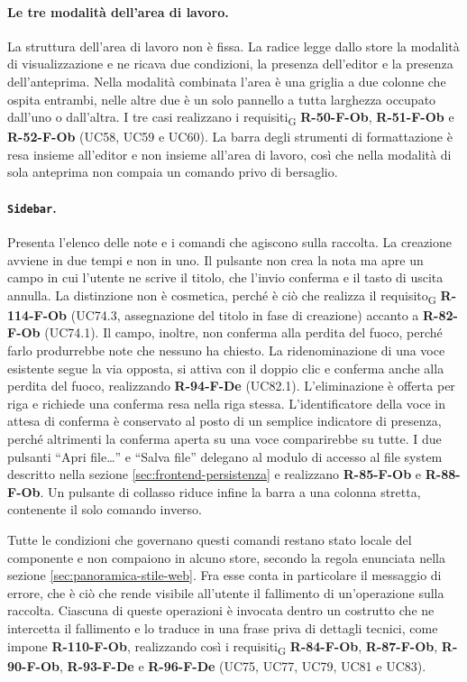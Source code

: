 \documentclass[a4paper, 10pt]{article}
\begin{document}
\paragraph{Le tre modalità dell'area di lavoro.}
La struttura dell'area di lavoro non è fissa. La radice legge dallo store la modalità di visualizzazione e ne ricava due condizioni, la presenza dell'editor e la presenza dell'anteprima. Nella modalità combinata l'area è una griglia a due colonne che ospita entrambi, nelle altre due è un solo pannello a tutta larghezza occupato dall'uno o dall'altra. I tre casi realizzano i requisiti\textsubscript{G} \textbf{R-50-F-Ob}, \textbf{R-51-F-Ob} e \textbf{R-52-F-Ob} (UC58, UC59 e UC60). La barra degli strumenti di formattazione è resa insieme all'editor e non insieme all'area di lavoro, così che nella modalità di sola anteprima non compaia un comando privo di bersaglio.

\paragraph{\texttt{Sidebar}.}
Presenta l'elenco delle note e i comandi che agiscono sulla raccolta. La creazione avviene in due tempi e non in uno. Il pulsante non crea la nota ma apre un campo in cui l'utente ne scrive il titolo, che l'invio conferma e il tasto di uscita annulla. La distinzione non è cosmetica, perché è ciò che realizza il requisito\textsubscript{G} \textbf{R-114-F-Ob} (UC74.3, assegnazione del titolo in fase di creazione) accanto a \textbf{R-82-F-Ob} (UC74.1). Il campo, inoltre, non conferma alla perdita del fuoco, perché farlo produrrebbe note che nessuno ha chiesto. La ridenominazione di una voce esistente segue la via opposta, si attiva con il doppio clic e conferma anche alla perdita del fuoco, realizzando \textbf{R-94-F-De} (UC82.1). L'eliminazione è offerta per riga e richiede una conferma resa nella riga stessa. L'identificatore della voce in attesa di conferma è conservato al posto di un semplice indicatore di presenza, perché altrimenti la conferma aperta su una voce comparirebbe su tutte. I due pulsanti ``Apri file\ldots'' e ``Salva file'' delegano al modulo di accesso al file system descritto nella sezione \ref{sec:frontend-persistenza} e realizzano \textbf{R-85-F-Ob} e \textbf{R-88-F-Ob}. Un pulsante di collasso riduce infine la barra a una colonna stretta, contenente il solo comando inverso.

Tutte le condizioni che governano questi comandi restano stato locale del componente e non compaiono in alcuno store, secondo la regola enunciata nella sezione \ref{sec:panoramica-stile-web}. Fra esse conta in particolare il messaggio di errore, che è ciò che rende visibile all'utente il fallimento di un'operazione sulla raccolta. Ciascuna di queste operazioni è invocata dentro un costrutto che ne intercetta il fallimento e lo traduce in una frase priva di dettagli tecnici, come impone \textbf{R-110-F-Ob}, realizzando così i requisiti\textsubscript{G} \textbf{R-84-F-Ob}, \textbf{R-87-F-Ob}, \textbf{R-90-F-Ob}, \textbf{R-93-F-De} e \textbf{R-96-F-De} (UC75, UC77, UC79, UC81 e UC83).
\end{document}
